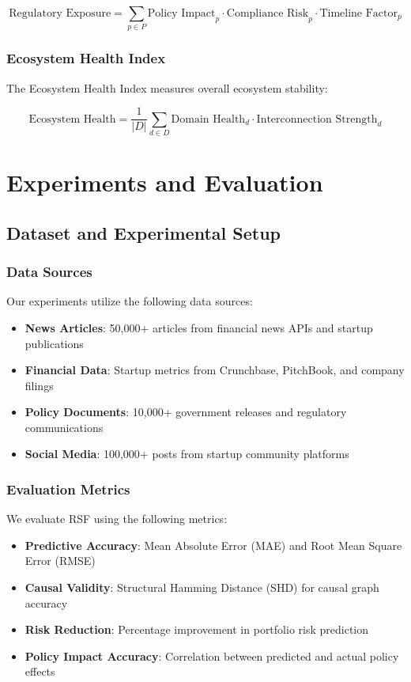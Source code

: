 \begin{equation}
\text{Regulatory Exposure} = \sum_{p \in P} \text{Policy Impact}_p \cdot \text{Compliance Risk}_p \cdot \text{Timeline Factor}_p
\end{equation}

\subsubsection{Ecosystem Health Index}
The Ecosystem Health Index measures overall ecosystem stability:

\begin{equation}
\text{Ecosystem Health} = \frac{1}{|D|} \sum_{d \in D} \text{Domain Health}_d \cdot \text{Interconnection Strength}_d
\end{equation}

\section{Experiments and Evaluation}

\subsection{Dataset and Experimental Setup}

\subsubsection{Data Sources}
Our experiments utilize the following data sources:
\begin{itemize}
    \item \textbf{News Articles}: 50,000+ articles from financial news APIs and startup publications
    \item \textbf{Financial Data}: Startup metrics from Crunchbase, PitchBook, and company filings
    \item \textbf{Policy Documents}: 10,000+ government releases and regulatory communications
    \item \textbf{Social Media}: 100,000+ posts from startup community platforms
\end{itemize}

\subsubsection{Evaluation Metrics}
We evaluate RSF using the following metrics:
\begin{itemize}
    \item \textbf{Predictive Accuracy}: Mean Absolute Error (MAE) and Root Mean Square Error (RMSE)
    \item \textbf{Causal Validity}: Structural Hamming Distance (SHD) for causal graph accuracy
    \item \textbf{Risk Reduction}: Percentage improvement in portfolio risk prediction
    \item \textbf{Policy Impact Accuracy}: Correlation between predicted and actual policy effects
\end{itemize}

